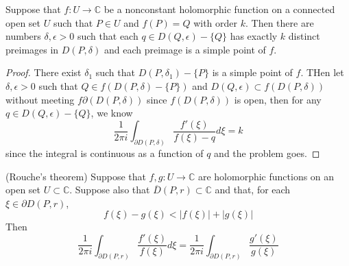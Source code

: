 \documentclass[lang=en, color=blue, ]{elegantbook}
\newcommand{\C}{\mathbb{C}}
\begin{document}
\begin{theorem}
    Suppose that $f:U\to\C$ be a nonconstant holomorphic function on a connected open set $U$ such that $P\in U$ and $f(P) = Q$ with order $k$. Then there are numbers $\delta,\epsilon > 0$ such that each $q\in D(Q,\epsilon)-\{Q\}$ has exactly $k$ distinct preimages in $D(P,\delta)$ and each preimage is a simple point of $f$.
\end{theorem}
\begin{proof}
    There exist $\delta_1$ such that $D(P,\delta_1)-\{P\}$ is a simple point of $f$. THen let $\delta,\epsilon > 0$ such that $Q\in f(D(P,\delta)-\{P\})$ and $D(Q,\epsilon) \subset f(D(P,\delta))$ without meeting $f\partial(D(P,\delta))$ since $f(D(P,\delta))$ is open, then for any $q\in D(Q,\epsilon)-\{Q\}$, we know
    \[\dfrac{1}{2\pi i}\int_{\partial D(P,\delta)} \dfrac{f'(\xi)}{f(\xi)-q}d\xi = k\]
    since the integral is continuous as a function of $q$ and the problem goes.
\end{proof}

\begin{theorem}
    (Rouche's theorem) Suppose that $f,g:U\to\C$ are holomorphic functions on an open set $U\subset\C$. Suppose also that $\overline{D}(P,r)\subset\C$ and that, for each $\xi\in\partial D(P,r)$,
    \[f(\xi)-g(\xi) < |f(\xi)|+|g(\xi)|\]
    Then
    \[
    \dfrac{1}{2\pi i}\int_{\partial D(P,r)} \dfrac{f'(\xi)}{f(\xi)} d\xi = \dfrac{1}{2\pi i}\int_{\partial D(P,r)} \dfrac{g'(\xi)}{g(\xi)}
    \]
\end{theorem}
\end{document}
